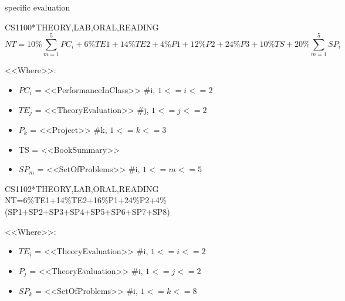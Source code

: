 specific evaluation
\begin{evaluation}{CS1100}{*}{THEORY,LAB,ORAL,READING}
\begin{equation}
NT=10\%\sum_{m=1}^{5} PC_i +6\%TE1+14\%TE2+4\%P1+12\%P2+24\%P3+10\%TS + 20\%\sum_{m=1}^{5} SP_i
\end{equation}

<<Where>>:
\begin{itemize}
  \item $PC_{i}$ = <<PerformanceInClass>> \#i, $1 <= i <=2$
  \item $TE_{j}$ = <<TheoryEvaluation>> \#j, $1 <= j <=2$
  \item $P_{k}$ = <<Project>> \#k, $1 <= k <=3$
  \item TS  = <<BookSummary>>
  \item $SP_{m}$ = <<SetOfProblems>> \#i, $1 <= m <=5$
\end{itemize}

\end{evaluation}

\begin{evaluation}{CS1102}{*}{THEORY,LAB,ORAL,READING}
NT=6\%TE1+14\%TE2+16\%P1+24\%P2+4\%(SP1+SP2+SP3+SP4+SP5+SP6+SP7+SP8)

<<Where>>:
\begin{itemize}
 \item $TE_{i}$ = <<TheoryEvaluation>> \#i, $1 <= i <=2$
 \item $P_{j}$ = <<TheoryEvaluation>> \#i, $1 <= j <=2$
 \item $SP_{k}$ = <<SetOfProblems>> \#i, $1 <= k <=8$
\end{itemize}
\end{evaluation}

